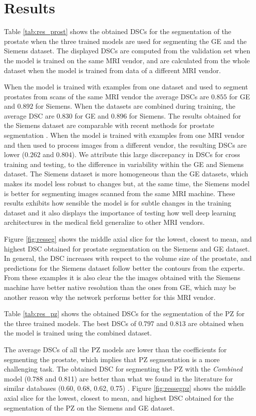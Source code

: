 \section{Results}
Table \ref{tab:res_prost} shows the obtained DSCs for the segmentation of the prostate when the three trained models are used for segmenting the GE and the Siemens dataset. The displayed DSCs are computed from the validation set when the model is trained on the same MRI vendor, and are calculated from the whole dataset when the model is trained from data of a different MRI vendor.

When the model is trained with examples from one dataset and used to segment prostates from scans of the same MRI vendor the average DSCs are $0.855$ for GE and $0.892$ for Siemens. When the datasets are combined during training, the average DSC are $0.830$ for GE and $0.896$ for Siemens.  The results obtained for the Siemens dataset are comparable with recent methods for prostate segmentation \cite{guo2016deformable, lozoya2018assessing, jia20183d}. When the model is trained with examples from one MRI vendor and then used to process images from a different vendor, the resulting DSCs are lower ($0.262$ and $0.804$). We attribute this large discrepancy in DSCs for cross training and testing, to the difference in variability within the GE and Siemens dataset. The Siemens dataset is more homogeneous than the GE datasets, which makes its model less robust to changes but, at the same time, the Siemens model is better for segmenting images scanned from the same MRI machine. These results exhibits how sensible the model is for subtle changes in the training dataset and it also displays the importance of testing how well deep learning architectures in the medical field generalize to other MRI vendors. 

Figure \ref{fig:resseg} shows the middle axial slice for the lowest, closest to mean, and highest DSC obtained for prostate segmentation on the Siemens and GE dataset. In general, the DSC increases with respect to the volume size of the prostate, and predictions for the Siemens dataset follow better the contours from the experts. From these examples it is also clear the the images obtained with the Siemens machine have better native resolution than the ones from GE, which may be another reason why the network performs better for this MRI vendor. 

Table \ref{tab:res_pz} shows the obtained DSCs for the segmentation of the PZ for the three trained models.  The best DSCs of $0.797$ and $0.813$ are obtained when the model is trained using the combined dataset.  

The average DSCs of all the PZ models are lower than the coefficients for segmenting the prostate, which implies that PZ segmentation is a more challenging task. The obtained DSC for segmenting the PZ with the \emph{Combined} model (0.788 and 0.811) are better than what we found in the literature for similar databases (0.60, 0.68, 0.62, 0.75) \cite{mooij_automatic_2018,toth_simultaneous_2013, chilali_gland_2016, hutchison_pattern_2012}. Figure \ref{fig:ressegpz} shows the middle axial slice for the lowest, closest to mean, and highest DSC obtained for the segmentation of the PZ on the Siemens and GE dataset. 
